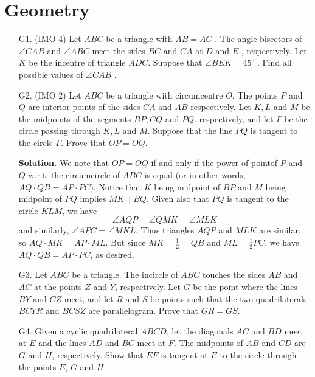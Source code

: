 \documentclass[11pt,a4paper]{article}
\begin{document}
    \section*{Geometry}
    \begin{enumerate}
    	\item [G1.] (IMO 4)
    	Let $ ABC$ be a triangle with $ AB = AC$ . The angle bisectors of $ \angle C AB$ and $ \angle AB C$ meet the sides $ B C$ and $ C A$ at $ D$ and $ E$ , respectively. Let $ K$ be the incentre of triangle $ ADC$. Suppose that $ \angle B E K = 45^\circ$ . Find all possible values of $ \angle C AB$ .
    	
    	\item [G2.] (IMO 2)
    	Let $ ABC$ be a triangle with circumcentre $ O$. The points $ P$ and $ Q$ are interior points of the sides $ CA$ and $ AB$ respectively. Let $ K,L$ and $ M$ be the midpoints of the segments $ BP,CQ$ and $ PQ$. respectively, and let $ \Gamma$ be the circle passing through $ K,L$ and $ M$. Suppose that the line $ PQ$ is tangent to the circle $ \Gamma$. Prove that $ OP = OQ.$
    	
    	\textbf{Solution.} 
    	We note that $OP=OQ$ if and only if the power of pointof $P$ and $Q$ w.r.t. the circumcircle of $ABC$ is equal (or in other words, $AQ\cdot QB = AP\cdot PC$). 
    	Notice that $K$ being midpoint of $BP$ and $M$ being midpoint of $PQ$ implies $MK\parallel BQ$. 
    	Given also that $PQ$ is tangent to the circle $KLM$, we have 
    	\[
    	\angle AQP = \angle QMK = \angle MLK
    	\]
    	and similarly, $\angle APC=\angle MKL$. 
    	Thus triangles $AQP$ and $MLK$ are similar, so 
    	$AQ\cdot MK = AP\cdot ML$. 
    	But since $MK = \frac 12 = QB$ and $ML = \frac 12 PC$, we have 
    	$AQ\cdot QB = AP\cdot PC$, as desired. 
    	
    	\item [G3.]
    	Let $ABC$ be a triangle. The incircle of $ABC$ touches the sides $AB$ and $AC$ at the points $Z$ and $Y$, respectively. Let $G$ be the point where the lines $BY$ and $CZ$ meet, and let $R$ and $S$ be points such that the two quadrilaterals $BCYR$ and $BCSZ$ are parallelogram.
    	Prove that $GR=GS$.
    	
    	\item [G4.]
    	Given a cyclic quadrilateral $ABCD$, let the diagonals $AC$ and $BD$ meet at $E$ and the lines $AD$ and $BC$ meet at $F$. The midpoints of $AB$ and $CD$ are $G$ and $H$, respectively. Show that $EF$ is tangent at $E$ to the circle through the points $E$, $G$ and $H$.
    	

\end{enumerate}
\end{document}
